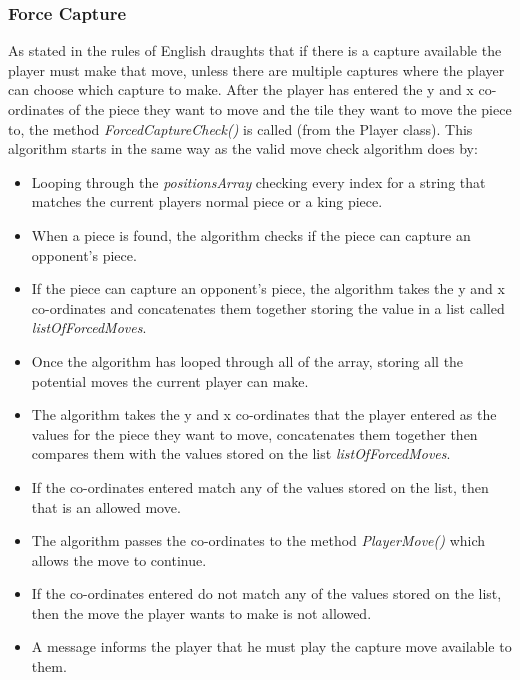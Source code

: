 \documentclass[10pt, a4paper]{article}
\begin{document}
   
    
    
    	\subsubsection{Force Capture} 
    	As stated in the rules of English draughts that if there is a capture available the player must make that move, unless there are multiple captures where the player can choose which capture to make. After the player has entered the y and x co-ordinates of the piece they want to move and the tile they want to move the piece to, the method \textit{ForcedCaptureCheck()} is called (from the Player class).
    	\newline
    	This algorithm starts in the same way as the valid move check algorithm does by:    
    
    	\begin{itemize}
   		\item Looping through the \textit{positionsArray} checking every index for a string that matches the current players normal piece or a king piece.
    	\item When a piece is found, the algorithm checks if the piece can capture an opponent's piece.
    	\item If the piece can capture an opponent's piece, the algorithm takes the y and x co-ordinates and concatenates them together storing the value in a list called \textit{listOfForcedMoves}.
    	\item Once the algorithm has looped through all of the array, storing all the potential moves the current player can make.
    	\item The algorithm takes the y and x co-ordinates that the player entered as the values for the piece they want to move, concatenates them together then compares them with the values stored on the list \textit{listOfForcedMoves}.
    	\item If the co-ordinates entered match any of the values stored on the list, then that is an allowed move.
    	\item The algorithm passes the co-ordinates to the method \textit{PlayerMove()} which allows the move to continue.
    	\item If the co-ordinates entered do not match any of the values stored on the list, then the move the player wants to make is not allowed.
    	\item A message informs the player that he must play the capture move available to them.
    	\end{itemize} 
    
\end{document}

